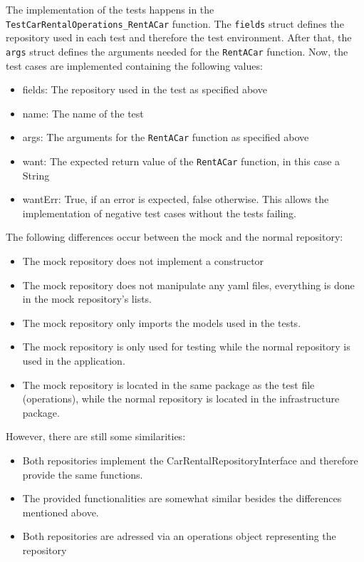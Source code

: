 The implementation of the tests happens in the \texttt{TestCarRentalOperations\_RentACar} function.
The \texttt{fields} struct defines the repository used in each test and therefore the test environment.
After that, the \texttt{args} struct defines the arguments needed for the \texttt{RentACar} function.
Now, the test cases are implemented containing the following values:
\begin{itemize}
      \item fields: The repository used in the test as specified above
      \item name: The name of the test
      \item args: The arguments for the \texttt{RentACar} function as specified above
      \item want: The expected return value of the \texttt{RentACar} function, in this case a String 
      \item wantErr: True, if an error is expected, false otherwise. 
            This allows the implementation of negative test cases without the tests failing.
\end{itemize}

The following differences occur between the mock and the normal repository:
\begin{itemize}
      \item The mock repository does not implement a constructor
      \item The mock repository does not manipulate any yaml files, everything is done in the mock repository's lists.
      \item The mock repository only imports the models used in the tests.
      \item The mock repository is only used for testing while the normal repository is used in the application.
      \item The mock repository is located in the same package as the test file (operations), while the normal repository is located in the infrastructure package.
\end{itemize}

However, there are still some similarities:
\begin{itemize}
      \item Both repositories implement the CarRentalRepositoryInterface and therefore provide the same functions.
      \item The provided functionalities are somewhat similar besides the differences mentioned above.
      \item Both repositories are adressed via an operations object representing the repository
\end{itemize}

